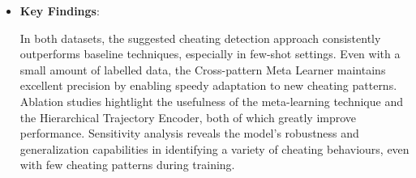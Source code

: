 \documentclass[a4paper, 12pt]{article}
\begin{document}
\begin{itemize}
\begin{itemize}
        \item \textbf{Key Findings}:

        In both datasets, the suggested cheating detection approach consistently outperforms baseline techniques, especially in few-shot settings. Even with a small amount of labelled data, the Cross-pattern Meta Learner maintains excellent precision by enabling speedy adaptation to new cheating patterns. Ablation studies hightlight the usefulness of the meta-learning technique and the Hierarchical Trajectory Encoder, both of which greatly improve performance. Sensitivity analysis reveals the model's robustness and generalization capabilities in identifying a variety of cheating behaviours, even with few cheating patterns during training.
        
    \end{itemize}
    

\end{itemize}
\end{document}
